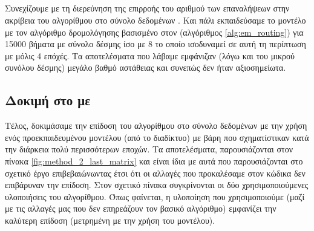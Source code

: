 \subsection{}

Συνεχίζουμε με τη διερεύνηση της επιρροής του αριθμού των επαναλήψεων στην ακρίβεια του αλγορίθμου στο σύνολο δεδομένων . Και πάλι εκπαιδεύσαμε το μοντέλο με τον αλγόριθμο δρομολόγησης βασισμένο στον  (αλγόριθμος \ref{alg:em_routing}) για 15000 βήματα με σύνολο δέσμης ίσο με 8 το οποίο ισοδυναμεί σε αυτή τη περίπτωση με μόλις 4 επόχές. Τα αποτελέσματα που λάβαμε εμφάνιζαν (λόγω και του μικρού συνόλου δέσμης) μεγάλο βαθμό αστάθειας και συνεπώς δεν ήταν αξιοσημείωτα.

\subsection{Δοκιμή στο  με }
Τέλος, δοκιμάσαμε την επίδοση του αλγορίθμου στο σύνολο δεδομένων  με την χρήση ενός προ\textendash εκπαιδευμένου μοντέλου (από το διαδίκτυο) με βάρη που σχηματίστικαν κατά την διάρκεια πολύ περισσότερων εποχών. Τα αποτελέσματα, παρουσιάζονται στον πίνακα \ref{fig:method_2_last_matrix} και είναι ίδια με αυτά που παρουσιάζονται στο σχετικό έργο \cite{hinton2018matrix} επιβεβαιώνωντας έτσι ότι οι αλλαγές που προκαλέσαμε στον κώδικα δεν επιβάρυναν την επίδοση. Στον σχετικό πίνακα συγκρίνονται οι δύο χρησιμοποιούμενες υλοποιήσεις του αλγορίθμου. Όπως φαίνεται, η υλοποίηση που χρησιμοποιούμε (μαζί με τις αλλαγές μας που δεν επηρεάζουν τον βασικό αλγόριθμο) εμφανίζει την καλύτερη επίδοση (μετρημένη με την χρήση του  μοντέλου).\par

